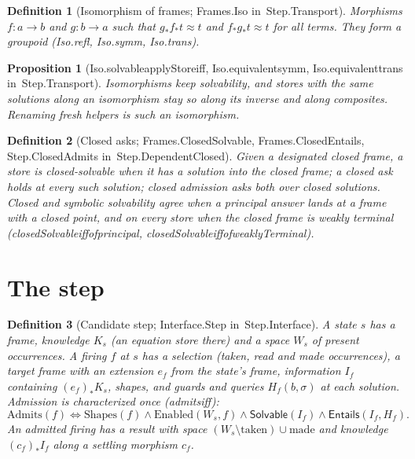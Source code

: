 \documentclass[11pt]{article}
\newtheorem{definition}{Definition}
\newtheorem{proposition}[theorem]{Proposition}
\theoremstyle{remark}
\newcommand{\lean}[1]{{\ttfamily\def\_{\textunderscore\allowbreak}#1}}
\newcommand{\inmod}[1]{in~{\ttfamily\def\_{\textunderscore\allowbreak}#1}}
\newcommand{\Solv}{\mathsf{Solvable}}
\newcommand{\Ent}{\mathsf{Entails}}
\begin{document}
\begin{definition}[Isomorphism of frames; \lean{Frames.Iso} \inmod{Step.Transport}]
Morphisms $f : a\to b$ and $g : b\to a$ such that $g_*f_*t \approx t$ and $f_*g_*t\approx t$ for all terms.
They form a groupoid (\lean{Iso.refl}, \lean{Iso.symm}, \lean{Iso.trans}).
\end{definition}

\begin{proposition}[\lean{Iso.solvable\_applyStore\_iff}, \lean{Iso.equivalent\_symm}, \lean{Iso.equivalent\_trans} \inmod{Step.Transport}]
Isomorphisms keep solvability, and stores with the same solutions along an isomorphism stay so along
its inverse and along composites. Renaming fresh helpers is such an isomorphism.
\end{proposition}

\begin{definition}[Closed asks; \lean{Frames.ClosedSolvable}, \lean{Frames.ClosedEntails}, \lean{Step.ClosedAdmits} \inmod{Step.DependentClosed}]\label{def:closed}
Given a designated closed frame, a store is \emph{closed-solvable} when it has a solution into the
closed frame; a \emph{closed ask} holds at every such solution; \emph{closed admission} asks both over
closed solutions. Closed and symbolic solvability agree when a principal answer lands at a frame with
a closed point, and on every store when the closed frame is weakly terminal
(\lean{closedSolvable\_iff\_of\_principal}, \lean{closedSolvable\_iff\_of\_weaklyTerminal}).
\end{definition}

\section{The step}

\begin{definition}[Candidate step; \lean{Interface.Step} \inmod{Step.Interface}]\label{def:step}
A state $s$ has a frame, knowledge $K_s$ (an equation store there) and a space $W_s$ of present
occurrences. A firing $f$ at $s$ has a selection (taken, read and made occurrences), a target frame with
an extension $e_f$ from the state's frame, information $I_f$ containing $(e_f)_*K_s$, shapes, and guards
and queries $H_f(b,\sigma)$ at each solution. Admission is characterized once (\lean{admits\_iff}):
\[
\mathrm{Admits}(f) \iff \mathrm{Shapes}(f) \wedge \mathrm{Enabled}(W_s,f) \wedge \Solv(I_f) \wedge \Ent(I_f,H_f).
\]
An admitted firing has a result with space $(W_s\setminus\text{taken})\cup\text{made}$ and
knowledge $(c_f)_* I_f$ along a settling morphism $c_f$.
\end{definition}
\end{document}
